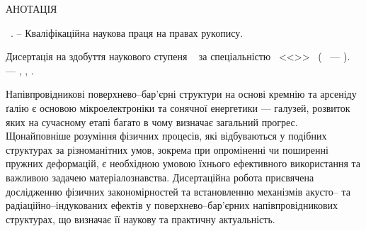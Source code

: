 \noindent
АНОТАЦІЯ						

\vspace{0.7cm}
\noindent
\thesisAuthorFIO~\thesisTitle. -- Кваліфікаційна наукова праця на правах рукопису.

\vspace{0.7cm}
\noindent
Дисертація на здобуття наукового ступеня \thesisDegree~
за спеціальністю \thesisSpecialtyNumber~<<\thesisSpecialtyTitle>>~
(\thesisKnowledgeNumber~ --- \thesisKnowledgeTitle). --- \thesisOrganization, \thesisCity, \thesisYear.

\vspace{0.7cm}

Напівпровідникові поверхнево--бар'єрні структури на основі кремнію та арсеніду ґалію є основою мікроелектроніки та сонячної енергетики --- галузей, розвиток яких на сучасному етапі багато в чому визначає загальний прогрес.
Щонайповніше розуміння фізичних процесів, які відбуваються у подібних структурах за різноманітних умов, зокрема при опроміненні чи поширенні пружних деформацій, є необхідною умовою їхнього ефективного використання та важливою задачею матеріалознавства.
Дисертаційна робота присвячена дослідженню фізичних  закономірностей  та встановленню механізмів акусто-- та радіаційно--індукованих ефектів у поверхнево--бар'єрних напівпровідникових структурах, що визначає її  наукову та практичну актуальність.


